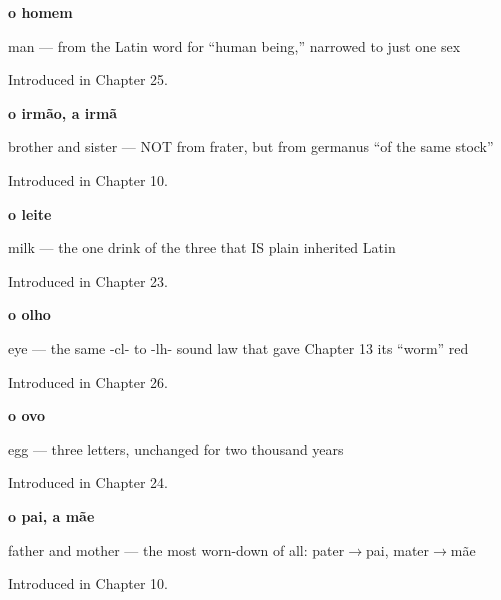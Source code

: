 \noindent\begin{minipage}[t]{\linewidth}
\raggedright
\textbf{o homem}\par
\small man — from the Latin word for \textquotedblleft{}human being,\textquotedblright{} narrowed to just one sex\par
\footnotesize Introduced in Chapter 25.
\end{minipage}\par\medskip

\noindent\begin{minipage}[t]{\linewidth}
\raggedright
\textbf{o irmão, a irmã}\par
\small brother and sister — NOT from frater, but from germanus \textquotedblleft{}of the same stock\textquotedblright{}\par
\footnotesize Introduced in Chapter 10.
\end{minipage}\par\medskip

\noindent\begin{minipage}[t]{\linewidth}
\raggedright
\textbf{o leite}\par
\small milk — the one drink of the three that IS plain inherited Latin\par
\footnotesize Introduced in Chapter 23.
\end{minipage}\par\medskip

\noindent\begin{minipage}[t]{\linewidth}
\raggedright
\textbf{o olho}\par
\small eye — the same -cl- to -lh- sound law that gave Chapter 13 its \textquotedblleft{}worm\textquotedblright{} red\par
\footnotesize Introduced in Chapter 26.
\end{minipage}\par\medskip

\noindent\begin{minipage}[t]{\linewidth}
\raggedright
\textbf{o ovo}\par
\small egg — three letters, unchanged for two thousand years\par
\footnotesize Introduced in Chapter 24.
\end{minipage}\par\medskip

\noindent\begin{minipage}[t]{\linewidth}
\raggedright
\textbf{o pai, a mãe}\par
\small father and mother — the most worn-down of all: pater$\to$pai, mater$\to$mãe\par
\footnotesize Introduced in Chapter 10.
\end{minipage}\par\medskip


